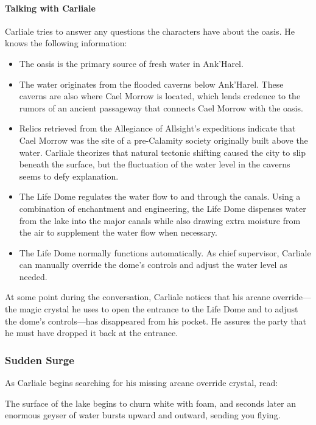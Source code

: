 \documentclass[10pt,a4paper,twoside,bg=print,twocolumn,openany,nodeprecatedcode]{dndbook}
\begin{document}
\paragraph{Talking with Carliale}
Carliale tries to answer any questions the characters have about the oasis. He knows the following information:


\begin{itemize}
\item The oasis is the primary source of fresh water in Ank'Harel.
\item The water originates from the flooded caverns below Ank'Harel. These caverns are also where Cael Morrow is located, which lends credence to the rumors of an ancient passageway that connects Cael Morrow with the oasis.
\item Relics retrieved from the Allegiance of Allsight's expeditions indicate that Cael Morrow was the site of a pre-Calamity society originally built above the water. Carliale theorizes that natural tectonic shifting caused the city to slip beneath the surface, but the fluctuation of the water level in the caverns seems to defy explanation.
\item The Life Dome regulates the water flow to and through the canals. Using a combination of enchantment and engineering, the Life Dome dispenses water from the lake into the major canals while also drawing extra moisture from the air to supplement the water flow when necessary.
\item The Life Dome normally functions automatically. As chief supervisor, Carliale can manually override the dome's controls and adjust the water level as needed.
\end{itemize}

At some point during the conversation, Carliale notices that his arcane override—the magic crystal he uses to open the entrance to the Life Dome and to adjust the dome's controls—has disappeared from his pocket. He assures the party that he must have dropped it back at the entrance.

\subsubsection{Sudden Surge}
As Carliale begins searching for his missing arcane override crystal, read:

\begin{DndReadAloud}{}
The surface of the lake begins to churn white with foam, and seconds later an enormous geyser of water bursts upward and outward, sending you flying.

\end{DndReadAloud}
\end{document}
